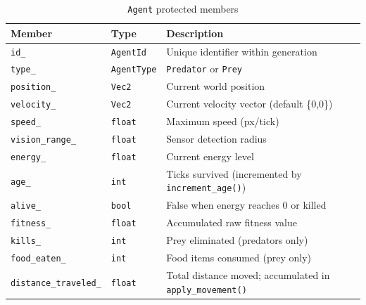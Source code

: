 \begin{table}[H]
\centering\small
\caption{\texttt{Agent} protected members}
\begin{tabularx}{\textwidth}{@{}llX@{}}
\toprule
\textbf{Member} & \textbf{Type} & \textbf{Description} \\
\midrule
\texttt{id\_}                & \texttt{AgentId}   & Unique identifier within generation \\
\texttt{type\_}              & \texttt{AgentType} & \texttt{Predator} or \texttt{Prey} \\
\texttt{position\_}          & \texttt{Vec2}      & Current world position \\
\texttt{velocity\_}          & \texttt{Vec2}      & Current velocity vector (default \{0,0\}) \\
\texttt{speed\_}             & \texttt{float}     & Maximum speed (px/tick) \\
\texttt{vision\_range\_}     & \texttt{float}     & Sensor detection radius \\
\texttt{energy\_}            & \texttt{float}     & Current energy level \\
\texttt{age\_}               & \texttt{int}       & Ticks survived (incremented by \texttt{increment\_age()}) \\
\texttt{alive\_}             & \texttt{bool}      & False when energy reaches 0 or killed \\
\texttt{fitness\_}           & \texttt{float}     & Accumulated raw fitness value \\
\texttt{kills\_}             & \texttt{int}       & Prey eliminated (predators only) \\
\texttt{food\_eaten\_}       & \texttt{int}       & Food items consumed (prey only) \\
\texttt{distance\_traveled\_}& \texttt{float}     & Total distance moved; accumulated in \texttt{apply\_movement()} \\
\bottomrule
\end{tabularx}
\end{table}

